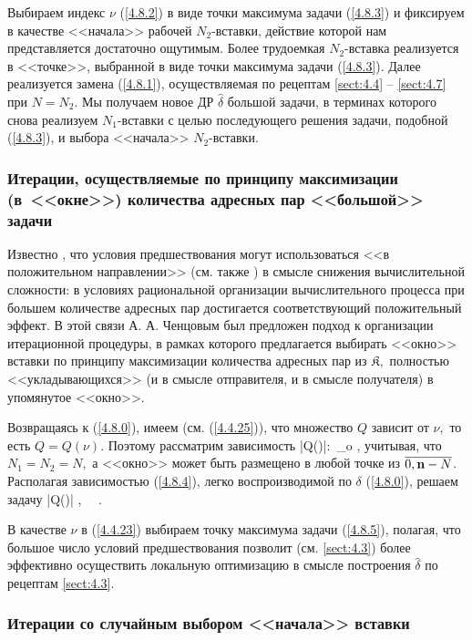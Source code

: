 Выбираем индекс $\nu$ (\ref{4.8.2})
в виде точки максимума задачи (\ref{4.8.3})
и фиксируем в качестве <<начала>> рабочей $N_2$-вставки,
действие которой нам представляется достаточно ощутимым.
Более трудоемкая $N_2$-вставка реализуется в <<точке>>,
выбранной в виде точки максимума задачи (\ref{4.8.3}).
Далее реализуется замена (\ref{4.8.1}),
осуществляемая по рецептам \ref{sect:4.4} -- \ref{sect:4.7}
при $N=N_2$.
Мы получаем новое ДР
$\hat{\delta}$ большой задачи,
в терминах которого снова реализуем
$N_1$-вставки с целью последующего решения задачи,
подобной (\ref{4.8.3}),
и выбора <<начала>> $N_2$-вставки.

\subsubsection*{
  Итерации, осуществляемые по принципу максимизации
  (в~<<окне>>) количества адресных пар
  <<большой>> задачи
}

Известно \cite[\S\,4.9]{Cha1`},
что условия предшествования могут использоваться
<<в положительном направлении>>
(см. также \cite[гл.~4]{Cha2`})
в смысле снижения вычислительной сложности:
в условиях рациональной организации вычислительного процесса при большем количестве адресных пар
достигается соответствующий положительный эффект.
В этой связи А. А. Ченцовым был предложен подход
к организации итерационной процедуры,
в рамках которого предлагается выбирать
<<окно>> вставки по
принципу максимизации количества адресных пар из $\mathfrak{K},$
полностью <<укладывающихся>>
(и в смысле отправителя, и в смысле получателя)
в упомянутое <<окно>>.


Возвращаясь к (\ref{4.8.0}),
имеем (см. (\ref{4.4.25})),
что множество $Q$ зависит от $\nu,$
то есть $Q = Q(\nu).$
Поэтому рассматрим зависимость
\bfn
  \label{4.8.4}
  \tilde{\nu}\longmapsto |Q(\tilde{\nu})|:\, \longrightarrow \bbn_o
  ,
\efn
учитывая, что $N_1 = N_2 =N,$
а <<окно>> может быть размещено в любой точке из $\ov{0,\nn-N}$.
Располагая зависимостью (\ref{4.8.4}),
легко воспроизводимой по $\delta$
(\ref{4.8.0}),
решаем задачу
\bfn
  \label{4.8.5}
  |Q(\tilde{\nu})| \longrightarrow \max,\ \ \tilde{\nu}\in {}
  .
\efn

В качестве $\nu$ в (\ref{4.4.23})
выбираем точку максимума задачи (\ref{4.8.5}),
полагая, что большое число условий предшествования позволит
(см. \ref{sect:4.3})
более эффективно осуществить
локальную оптимизацию в смысле построения
$\hat{\delta}$ по рецептам \ref{sect:4.3}.

\subsubsection*{
  Итерации со случайным выбором <<начала>> вставки
}

